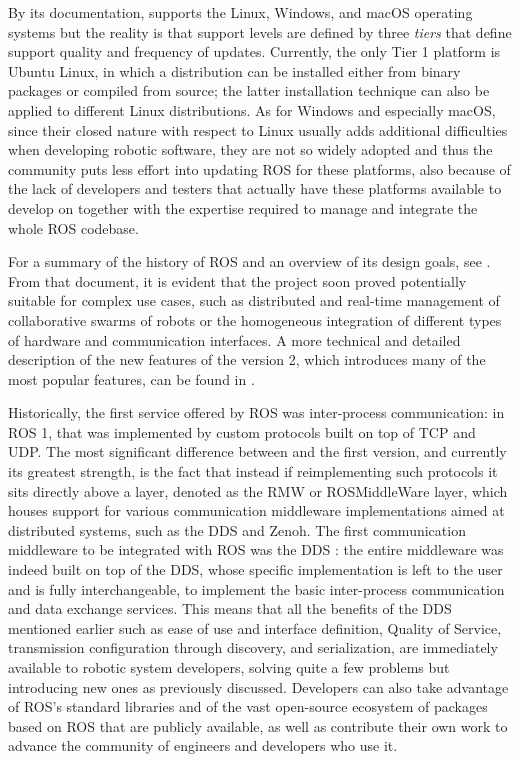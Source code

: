 By its documentation, \ROS supports the Linux, Windows, and macOS operating systems but the reality is that support levels are defined by three \emph{tiers} that define support quality and frequency of updates. Currently, the only Tier 1 platform is Ubuntu Linux, in which a \ROS distribution can be installed either from binary packages or compiled from source; the latter installation technique can also be applied to different Linux distributions. As for Windows and especially macOS, since their closed nature with respect to Linux usually adds additional difficulties when developing robotic software, they are not so widely adopted and thus the community puts less effort into updating ROS for these platforms, also because of the lack of developers and testers that actually have these platforms available to develop on together with the expertise required to manage and integrate the whole ROS codebase.

For a summary of the history of ROS and an overview of its design goals, see \cite{gerkey_why_2014}. From that document, it is evident that the project soon proved potentially suitable for complex use cases, such as distributed and real-time management of collaborative swarms of robots or the homogeneous integration of different types of hardware and communication interfaces. A more technical and detailed description of the new features of the version 2, which introduces many of the most popular features, can be found in \cite{thomas_changes_2015}.

Historically, the first service offered by ROS was inter-process communication: in ROS 1, that was implemented by custom protocols built on top of TCP and UDP. The most significant difference between \ROS and the first version, and currently its greatest strength, is the fact that instead if reimplementing such protocols it sits directly above a layer, denoted as the RMW or ROSMiddleWare layer, which houses support for various communication middleware implementations aimed at distributed systems, such as the DDS and Zenoh. The first communication middleware to be integrated with ROS was the DDS \cite{woodall_ros_2014}: the entire middleware was indeed built on top of the DDS, whose specific implementation is left to the user and is fully interchangeable, to implement the basic inter-process communication and data exchange services. This means that all the benefits of the DDS mentioned earlier such as ease of use and interface definition, Quality of Service, transmission configuration through discovery, and serialization, are immediately available to robotic system developers, solving quite a few problems but introducing new ones as previously discussed. Developers can also take advantage of ROS's standard libraries and of the vast open-source ecosystem of packages based on ROS that are publicly available, as well as contribute their own work to advance the community of engineers and developers who use it.

